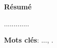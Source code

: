 \newpage
\thispagestyle{empty}
\begin{center}
{\Large \textbf{Résumé}}
\end{center}
%
.............

\vspace{0.5cm}
\textbf{Mots clés}: ..., .